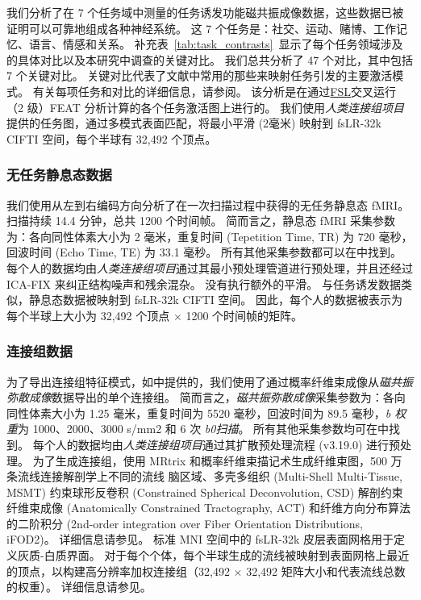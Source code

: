 \documentclass[lang=cn,a4paper,newtx,citestyle=gb7714-2015, bibstyle=gb7714-2015]{elegantpaper}
\begin{document}
我们分析了在 7 个任务域中测量的任务诱发功能磁共振成像数据，这些数据已被证明可以可靠地组成各种神经系统\cite{barch2013function}。
这 7 个任务是：社交、运动、赌博、工作记忆、语言、情感和关系。
补充表~\ref{tab:task_contrasts}~显示了每个任务领域涉及的具体对比以及本研究中调查的关键对比。
我们总共分析了 47 个对比，其中包括 7 个关键对比。
关键对比代表了文献中常用的那些来映射任务引发的主要激活模式。
有关每项任务和对比的详细信息，请参阅\cite{barch2013function}。
该分析是在通过\href{https://fsl.fmrib.ox.ac.uk/}{FSL}交叉运行（2 级）FEAT 分析\cite{woolrich2004multilevel}计算的各个任务激活图上进行的。
我们使用\textit{人类连接组项目}提供的任务图，通过多模式表面匹配\cite{robinson2018multimodal}，将最小平滑 (2毫米) 映射到 fsLR-32k CIFTI 空间，每个半球有 32,492 个顶点。



\subsubsection{无任务静息态数据} \label{sec:sup_2_2}

我们使用从左到右编码方向分析了在一次扫描过程中获得的无任务静息态 fMRI。
扫描持续 14.4 分钟，总共 1200 个时间帧。
简而言之，静息态 fMRI 采集参数为：各向同性体素大小为 2 毫米，重复时间 (Tepetition Time, TR) 为 720 毫秒，回波时间 (Echo Time, TE) 为 33.1 毫秒。
所有其他采集参数都可以在\cite{van2013wu}中找到。
每个人的数据均由\textit{人类连接组项目}通过其最小预处理管道进行预处理\cite{glasser2013minimal}，并且还经过 ICA-FIX 来纠正结构噪声和残余混杂\cite{salimi2014automatic}。
没有执行额外的平滑。
与任务诱发数据类似，静息态数据被映射到 fsLR-32k CIFTI 空间。
因此，每个人的数据被表示为每个半球上大小为 32,492 个顶点 $ \times $ 1200 个时间帧的矩阵。


\subsubsection{连接组数据} \label{sec:sup_2_3}

为了导出连接组特征模式，如\cite{tian2021high}中提供的，我们使用了通过概率纤维束成像从\textit{磁共振弥散成像}数据导出的单个连接组。
简而言之，\textit{磁共振弥散成像}采集参数为：各向同性体素大小为 1.25 毫米，重复时间为 5520 毫秒，回波时间为 89.5 毫秒，\textit{b 权重}为 1000、2000、3000 s/mm2 和 6 次 \textit{b0扫描}。
所有其他采集参数均可在\cite{van2013wu}中找到。
每个人的数据均由\textit{人类连接组项目}通过其扩散预处理流程 (v3.19.0) \cite{glasser2013minimal}进行预处理。
为了生成连接组，使用 MRtrix 和概率纤维束描记术生成纤维束图，500 万条流线连接解剖学上不同的流线 脑区域、多壳多组织 (Multi-Shell Multi-Tissue, MSMT) 约束球形反卷积 (Constrained Spherical Deconvolution, CSD) 解剖约束纤维束成像 (Anatomically Constrained Tractography, ACT) 和纤维方向分布算法的二阶积分 (2nd-order integration over Fiber Orientation Distributions, iFOD2)。
详细信息请参见\cite{tian2021high}。
标准 MNI 空间中的 fsLR-32k 皮层表面网格用于定义灰质-白质界面。
对于每个个体，每个半球生成的流线被映射到表面网格上最近的顶点，以构建高分辨率加权连接组（32,492 $ \times $ 32,492 矩阵大小和代表流线总数的权重）。
详细信息请参见\cite{tian2021high}。
\end{document}

